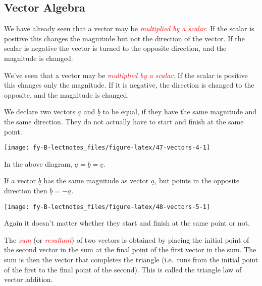 \documentclass[
  11pt,
  oneside]{book}
\newcommand{\slide}{}
\theoremstyle{definition}
\theoremstyle{definition}
\theoremstyle{definition}
\theoremstyle{definition}
\theoremstyle{remark}
\begin{document}
\subsection{Vector Algebra}\label{vector-algebra}

\begin{notslides}

We have already seen that a vector may be \textcolor{red}{\em multiplied by a scalar}. If the scalar is positive this changes the magnitude but not the direction of the vector. If the scalar is negative the vector is turned to the opposite direction, and the magnitude is changed.

\end{notslides}

\begin{slidesonly}

We've seen that a vector may be \textcolor{red}{\em multiplied by a scalar}.
If the scalar is positive this changes only the magnitude.
If it is negative, the direction is changed to the
opposite, and the magnitude is changed.

\end{slidesonly}

We declare two vectors \(\underline{a}\) and \(\underline{b}\) to be equal, if they have the same magnitude and the same direction. They do not actually have to start and finish at the same point.

\begin{center}\texttt{[image: fy-B-lectnotes\_files/figure-latex/47-vectors-4-1]} \end{center}

In the above diagram, \(\underline a= \underline b = \underline c\).

\slide

If a vector \(\underline b\) has the same magnitude as vector \(\underline a\), but points in the opposite direction then \(\underline b = -\underline a\).

\begin{center}\texttt{[image: fy-B-lectnotes\_files/figure-latex/48-vectors-5-1]} \end{center}

Again it doesn't matter whether they start and finish at the same point or not.

\slide

The \textcolor{red}{\em sum} (or \textcolor{red}{\em resultant}) of two vectors is obtained by placing the initial point of the second vector in the sum at the final point of the first vector in the sum. The sum is then the vector that completes the triangle (i.e.~runs from the initial point of the first to the final point of the second). This is called the triangle law of vector addition.
\end{document}
